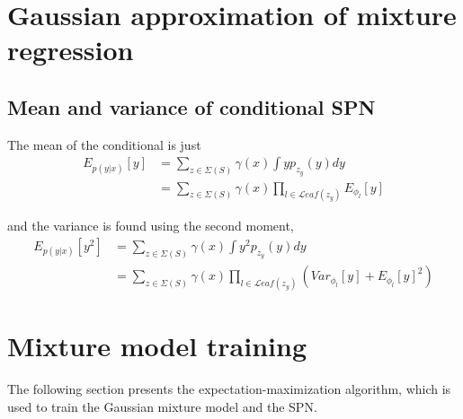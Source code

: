 \section{Gaussian approximation of mixture regression}



\subsection{Mean and variance of conditional SPN}

The mean of the conditional is just
\begin{align*}
    E_{p(y|x)}[y] &= \sum_{z \in \Sigma(S)} \gamma(x) \int  y p_{z_y}(y) dy \\
    &= \sum_{z \in \Sigma(S)} \gamma(x) \prod_{l \in \mathcal{L}eaf(z_y)} E_{\phi_l}[y]
\end{align*}

and the variance is found using the second moment, 
\begin{align*}
    E_{p(y|x)}[y^2] &= \sum_{z \in \Sigma(S)} \gamma(x) \int  y^2 p_{z_y}(y) dy \\
    &= \sum_{z \in \Sigma(S)} \gamma(x) \prod_{l \in \mathcal{L}eaf(z_y)} (Var_{\phi_l}[y]+E_{\phi_l}[y]^2)
\end{align*}

\section{Mixture model training}
The following section presents the expectation-maximization algorithm, which is used to 
train the Gaussian mixture model and the SPN. 

